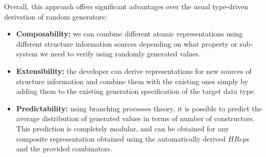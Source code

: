 \documentclass[conference, fleqn]{IEEEtran}
\newcommand{\Conid}[1]{\mathit{#1}}
\begin{document}
Overall, this approach offers significant advantages over the usual type-driven
derivation of random generators:
%
\begin{itemize}
\item \textbf{Composability:} we can combine different atomic representations
  using different structure information sources depending on what property or
  sub-system we need to verify using randomly generated values.
\item \textbf{Extensibility:} the developer can derive representations for new
  sources of structure information and combine them with the existing ones
  simply by adding them to the existing generation specification of the target
  data type.
\item \textbf{Predictability:} using branching processes theory, it is possible
  to predict the average distribution of generated values in terms of number of
  constructors.
  This prediction is completely modular, and can be obtained for any composite
  representation obtained using the automatically derived \ensuremath{\Conid{HRep}}s and the
  provided combinators.
\end{itemize}




%
%





\end{document}
